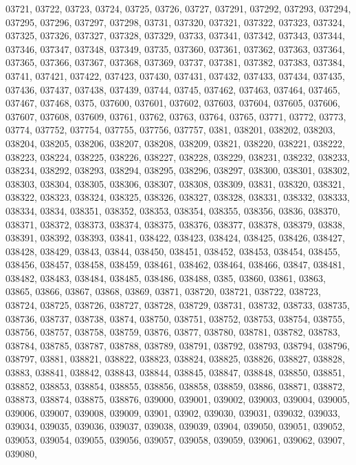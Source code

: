 {03721,
03722,
03723,
03724,
03725,
03726,
03727,
037291,
037292,
037293,
037294,
037295,
037296,
037297,
037298,
03731,
037320,
037321,
037322,
037323,
037324,
037325,
037326,
037327,
037328,
037329,
03733,
037341,
037342,
037343,
037344,
037346,
037347,
037348,
037349,
03735,
037360,
037361,
037362,
037363,
037364,
037365,
037366,
037367,
037368,
037369,
03737,
037381,
037382,
037383,
037384,
03741,
037421,
037422,
037423,
037430,
037431,
037432,
037433,
037434,
037435,
037436,
037437,
037438,
037439,
03744,
03745,
037462,
037463,
037464,
037465,
037467,
037468,
0375,
037600,
037601,
037602,
037603,
037604,
037605,
037606,
037607,
037608,
037609,
03761,
03762,
03763,
03764,
03765,
03771,
03772,
03773,
03774,
037752,
037754,
037755,
037756,
037757,
0381,
038201,
038202,
038203,
038204,
038205,
038206,
038207,
038208,
038209,
03821,
038220,
038221,
038222,
038223,
038224,
038225,
038226,
038227,
038228,
038229,
038231,
038232,
038233,
038234,
038292,
038293,
038294,
038295,
038296,
038297,
038300,
038301,
038302,
038303,
038304,
038305,
038306,
038307,
038308,
038309,
03831,
038320,
038321,
038322,
038323,
038324,
038325,
038326,
038327,
038328,
038331,
038332,
038333,
038334,
03834,
038351,
038352,
038353,
038354,
038355,
038356,
03836,
038370,
038371,
038372,
038373,
038374,
038375,
038376,
038377,
038378,
038379,
03838,
038391,
038392,
038393,
03841,
038422,
038423,
038424,
038425,
038426,
038427,
038428,
038429,
03843,
03844,
038450,
038451,
038452,
038453,
038454,
038455,
038456,
038457,
038458,
038459,
038461,
038462,
038464,
038466,
03847,
038481,
038482,
038483,
038484,
038485,
038486,
038488,
0385,
03860,
03861,
03863,
03865,
03866,
03867,
03868,
03869,
03871,
038720,
038721,
038722,
038723,
038724,
038725,
038726,
038727,
038728,
038729,
038731,
038732,
038733,
038735,
038736,
038737,
038738,
03874,
038750,
038751,
038752,
038753,
038754,
038755,
038756,
038757,
038758,
038759,
03876,
03877,
038780,
038781,
038782,
038783,
038784,
038785,
038787,
038788,
038789,
038791,
038792,
038793,
038794,
038796,
038797,
03881,
038821,
038822,
038823,
038824,
038825,
038826,
038827,
038828,
03883,
038841,
038842,
038843,
038844,
038845,
038847,
038848,
038850,
038851,
038852,
038853,
038854,
038855,
038856,
038858,
038859,
03886,
038871,
038872,
038873,
038874,
038875,
038876,
039000,
039001,
039002,
039003,
039004,
039005,
039006,
039007,
039008,
039009,
03901,
03902,
039030,
039031,
039032,
039033,
039034,
039035,
039036,
039037,
039038,
039039,
03904,
039050,
039051,
039052,
039053,
039054,
039055,
039056,
039057,
039058,
039059,
039061,
039062,
03907,
039080,
}
